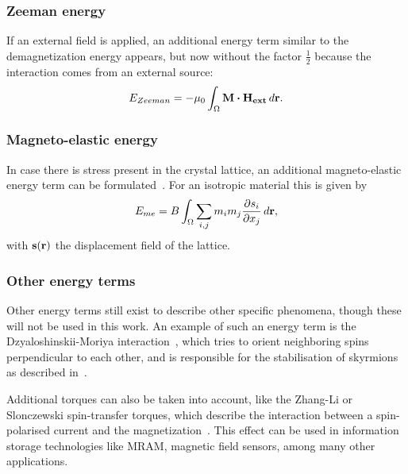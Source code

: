\documentclass[11pt,a4paper,english]{article}
\begin{document}
\subsubsection{Zeeman energy}
If an external field is applied, an additional energy term similar to the demagnetization energy appears, but now without the factor $\frac{1}{2}$ because the interaction comes from an external source:
\begin{equation}
    E_{Zeeman} = -\mu_0 \int_\Omega \vb{M} \vdot \vb{H_{ext}} \, d\vb{r} \mathrm{.} \label{eq:Energy_Term_Zeeman}
\end{equation}

\subsubsection{Magneto-elastic energy}
\label{par:Energy_MagnetoElastic}
In case there is stress present in the crystal lattice, an additional magneto-elastic energy term can be formulated~\cite{Gilbert1956}. For an isotropic material this is given by
\begin{equation}
    E_{me} = B \int_\Omega \sum_{i,j} m_i m_j \frac{\partial s_i}{\partial x_j} \,d\vb{r} \mathrm{,}
\end{equation}
with $\vb{s}(\vb{r})$ the displacement field of the lattice.

\subsubsection{Other energy terms}
Other energy terms still exist to describe other specific phenomena, though these will not be used in this work. An example of such an energy term is the Dzyaloshinskii-Moriya interaction~\cite{DzyaloshinskiiMoriya}, which tries to orient neighboring spins perpendicular to each other, and is responsible for the stabilisation of skyrmions as described in~\cite{skyrmions}. \par Additional torques can also be taken into account, like the Zhang-Li or Slonczewski spin-transfer torques, which describe the interaction between a spin-polarised current and the magnetization~\cite{ZhangLiSpinTransferTorque, MuMax3, syllabus_PoAEaPD}. This effect can be used in information storage technologies like MRAM, magnetic field sensors, among many other applications.~\cite{syllabus_PoAEaPD} %
\end{document}
